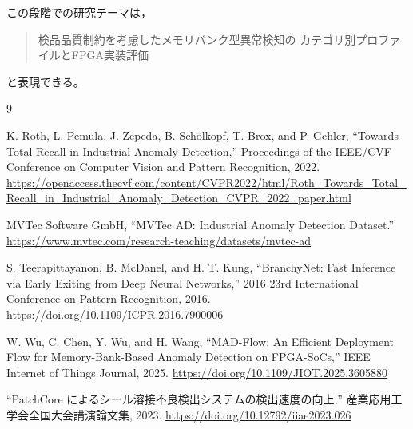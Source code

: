 \documentclass[uplatex,dvipdfmx,a4paper,11pt]{jsarticle}
\begin{document}
この段階での研究テーマは，
\begin{quote}
検品品質制約を考慮したメモリバンク型異常検知の
カテゴリ別プロファイルとFPGA実装評価
\end{quote}
と表現できる。

\begin{thebibliography}{9}

K. Roth, L. Pemula, J. Zepeda, B. Schölkopf, T. Brox, and P. Gehler,
``Towards Total Recall in Industrial Anomaly Detection,''
Proceedings of the IEEE/CVF Conference on Computer Vision and Pattern Recognition,
2022.
\url{https://openaccess.thecvf.com/content/CVPR2022/html/Roth_Towards_Total_Recall_in_Industrial_Anomaly_Detection_CVPR_2022_paper.html}

MVTec Software GmbH,
``MVTec AD: Industrial Anomaly Detection Dataset.''
\url{https://www.mvtec.com/research-teaching/datasets/mvtec-ad}

S. Teerapittayanon, B. McDanel, and H. T. Kung,
``BranchyNet: Fast Inference via Early Exiting from Deep Neural Networks,''
2016 23rd International Conference on Pattern Recognition, 2016.
\url{https://doi.org/10.1109/ICPR.2016.7900006}

W. Wu, C. Chen, Y. Wu, and H. Wang,
``MAD-Flow: An Efficient Deployment Flow for Memory-Bank-Based Anomaly Detection on FPGA-SoCs,''
IEEE Internet of Things Journal, 2025.
\url{https://doi.org/10.1109/JIOT.2025.3605880}

``PatchCore によるシール溶接不良検出システムの検出速度の向上,''
産業応用工学会全国大会講演論文集, 2023.
\url{https://doi.org/10.12792/iiae2023.026}

\end{thebibliography}
\end{document}

